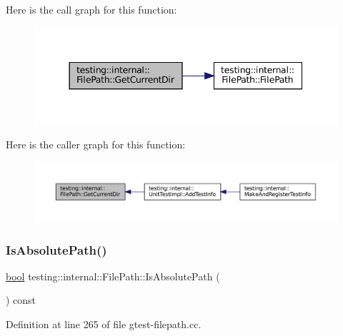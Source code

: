 Here is the call graph for this function\+:
\nopagebreak
\begin{figure}[H]
\begin{center}
\leavevmode
\includegraphics[width=344pt]{classtesting_1_1internal_1_1FilePath_aaff39ccd7bfb7a1c09c0220a64326387_cgraph}
\end{center}
\end{figure}
Here is the caller graph for this function\+:
\nopagebreak
\begin{figure}[H]
\begin{center}
\leavevmode
\includegraphics[width=350pt]{classtesting_1_1internal_1_1FilePath_aaff39ccd7bfb7a1c09c0220a64326387_icgraph}
\end{center}
\end{figure}
\mbox{\label{classtesting_1_1internal_1_1FilePath_ae17e5581e7996021e598851fe947df9c}} 
\subsubsection{\texorpdfstring{Is\+Absolute\+Path()}{IsAbsolutePath()}}
{\footnotesize\ttfamily \hyperlink{classbool}{bool} testing\+::internal\+::\+File\+Path\+::\+Is\+Absolute\+Path (\begin{DoxyParamCaption}{ }\end{DoxyParamCaption}) const}



Definition at line 265 of file gtest-\/filepath.\+cc.



